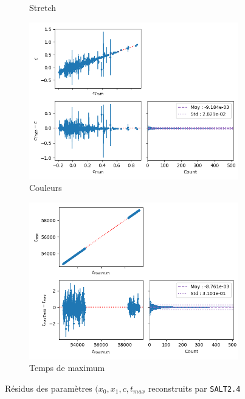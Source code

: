 \documentclass{book}
\def\saltd{\texttt{SALT2.4}\xspace}
\begin{document}
\begin{figure}[h]
\begin{subfigure}{0.45\textwidth}
		\caption{Stretch}
		\label{fig:salt_x1}
	\end{subfigure}
	\hfill
	\begin{subfigure}{0.45\textwidth}
		\centering
		\includegraphics[width=\textwidth]{figures/salt_c.png}
		\caption{Couleurs}
		\label{fig:salt_c}
	\end{subfigure}
	\hfill
	\begin{subfigure}{0.45\textwidth}
		\centering
		\includegraphics[width=\textwidth]{figures/salt_tmax.png}
		\caption{Temps de maximum }
		\label{fig:salt_tmax}
	\end{subfigure}
	\caption{Résidus des paramètres $(x_0, x_1, c, t_{max}$ reconstruits par \saltd}
	\label{fig:salt_residuals}
\end{figure}
\end{document}
